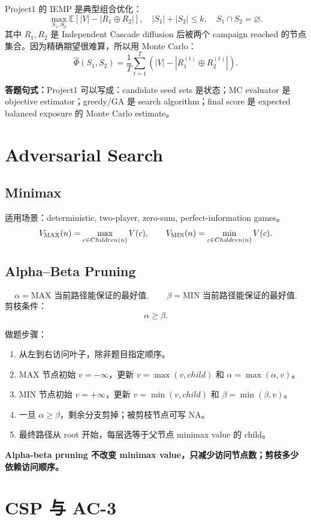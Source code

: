 \documentclass[UTF8,11pt,a4paper]{ctexart}
\newcommand{\warn}[1]{\textbf{\color{red!60!black}#1}}
\newcommand{\ans}[1]{\textbf{答题句式：}#1}
\newcommand{\E}{\mathbb{E}}
\begin{document}
Project1 的 IEMP 是典型组合优化：
\[
\max_{S_1,S_2}\E\left[|V|-|R_1\oplus R_2|\right],
\quad |S_1|+|S_2|\le k,\quad S_1\cap S_2=\varnothing.
\]
其中 $R_1,R_2$ 是 Independent Cascade diffusion 后被两个 campaign reached 的节点集合。因为精确期望很难算，所以用 Monte Carlo：
\[
\hat{\Phi}(S_1,S_2)=\frac1T\sum_{t=1}^T
\left(|V|-|R_1^{(t)}\oplus R_2^{(t)}|\right).
\]

\ans{Project1 可以写成：candidate seed sets 是状态；MC evaluator 是 objective estimator；greedy/GA 是 search algorithm；final score 是 expected balanced exposure 的 Monte Carlo estimate。}

\section{Adversarial Search}

\subsection{Minimax}

适用场景：deterministic, two-player, zero-sum, perfect-information games。
\[
V_{\rm MAX}(n)=\max_{c\in Children(n)}V(c),\qquad
V_{\rm MIN}(n)=\min_{c\in Children(n)}V(c).
\]

\subsection{Alpha--Beta Pruning}

\[
\alpha=\text{MAX 当前路径能保证的最好值},\qquad
\beta=\text{MIN 当前路径能保证的最好值}.
\]
剪枝条件：
\[
\boxed{\alpha\ge \beta}.
\]

做题步骤：
\begin{enumerate}
\item 从左到右访问叶子，除非题目指定顺序。
\item MAX 节点初始 $v=-\infty$，更新 $v=\max(v,child)$ 和 $\alpha=\max(\alpha,v)$。
\item MIN 节点初始 $v=+\infty$，更新 $v=\min(v,child)$ 和 $\beta=\min(\beta,v)$。
\item 一旦 $\alpha\ge\beta$，剩余分支剪掉；被剪枝节点可写 NA。
\item 最终路径从 root 开始，每层选等于父节点 minimax value 的 child。
\end{enumerate}

\warn{Alpha-beta pruning 不改变 minimax value，只减少访问节点数；剪枝多少依赖访问顺序。}

\section{CSP 与 AC-3}
\end{document}
